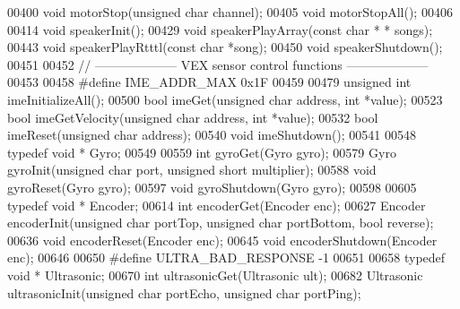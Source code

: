 \begin{DoxyCode}
00400 \textcolor{keywordtype}{void} motorStop(\textcolor{keywordtype}{unsigned} \textcolor{keywordtype}{char} channel);
00405 \textcolor{keywordtype}{void} motorStopAll();
00406 
00414 \textcolor{keywordtype}{void} speakerInit();
00429 \textcolor{keywordtype}{void} speakerPlayArray(\textcolor{keyword}{const} \textcolor{keywordtype}{char} * * songs);
00443 \textcolor{keywordtype}{void} speakerPlayRtttl(\textcolor{keyword}{const} \textcolor{keywordtype}{char} *song);
00450 \textcolor{keywordtype}{void} speakerShutdown();
00451 
00452 \textcolor{comment}{// -------------------- VEX sensor control functions --------------------}
00453 
00458 \textcolor{preprocessor}{#define IME\_ADDR\_MAX 0x1F}
00459 
00479 \textcolor{keywordtype}{unsigned} \textcolor{keywordtype}{int} imeInitializeAll();
00500 \textcolor{keywordtype}{bool} imeGet(\textcolor{keywordtype}{unsigned} \textcolor{keywordtype}{char} address, \textcolor{keywordtype}{int} *value);
00523 \textcolor{keywordtype}{bool} imeGetVelocity(\textcolor{keywordtype}{unsigned} \textcolor{keywordtype}{char} address, \textcolor{keywordtype}{int} *value);
00532 \textcolor{keywordtype}{bool} imeReset(\textcolor{keywordtype}{unsigned} \textcolor{keywordtype}{char} address);
00540 \textcolor{keywordtype}{void} imeShutdown();
00541 
00548 \textcolor{keyword}{typedef} \textcolor{keywordtype}{void} * Gyro;
00549 
00559 \textcolor{keywordtype}{int} gyroGet(Gyro gyro);
00579 Gyro gyroInit(\textcolor{keywordtype}{unsigned} \textcolor{keywordtype}{char} port, \textcolor{keywordtype}{unsigned} \textcolor{keywordtype}{short} multiplier);
00588 \textcolor{keywordtype}{void} gyroReset(Gyro gyro);
00597 \textcolor{keywordtype}{void} gyroShutdown(Gyro gyro);
00598 
00605 \textcolor{keyword}{typedef} \textcolor{keywordtype}{void} * Encoder;
00614 \textcolor{keywordtype}{int} encoderGet(Encoder enc);
00627 Encoder encoderInit(\textcolor{keywordtype}{unsigned} \textcolor{keywordtype}{char} portTop, \textcolor{keywordtype}{unsigned} \textcolor{keywordtype}{char} portBottom, \textcolor{keywordtype}{bool} 
      reverse);
00636 \textcolor{keywordtype}{void} encoderReset(Encoder enc);
00645 \textcolor{keywordtype}{void} encoderShutdown(Encoder enc);
00646 
00650 \textcolor{preprocessor}{#define ULTRA\_BAD\_RESPONSE -1}
00651 
00658 \textcolor{keyword}{typedef} \textcolor{keywordtype}{void} * Ultrasonic;
00670 \textcolor{keywordtype}{int} ultrasonicGet(Ultrasonic ult);
00682 Ultrasonic ultrasonicInit(\textcolor{keywordtype}{unsigned} \textcolor{keywordtype}{char} portEcho, \textcolor{keywordtype}{unsigned} \textcolor{keywordtype}{char} portPing);

\end{DoxyCode}
